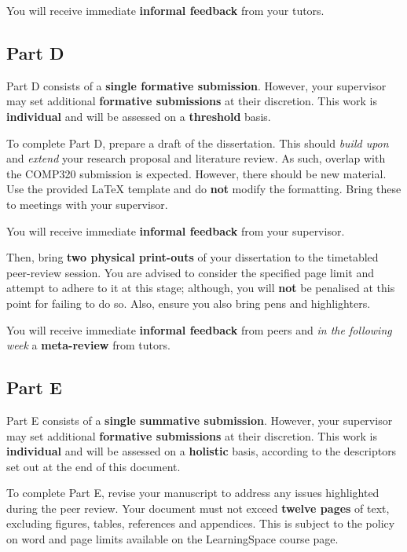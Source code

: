\documentclass{../fal_assignment}
\begin{document}
You will receive immediate \textbf{informal feedback} from your tutors.

\subsection*{Part D}

Part D consists of a \textbf{single formative submission}. 
However, your supervisor may set additional \textbf{formative submissions} at their discretion.
This work is \textbf{individual} and will be assessed on a \textbf{threshold} basis.

To complete Part D, prepare a draft of the dissertation. This should \textit{build upon} and \textit{extend} your research proposal and
literature review. As such, overlap with the COMP320 submission is expected. However, there should be new material.
Use the provided LaTeX template and do \textbf{not} modify the formatting. Bring these to meetings with your supervisor.

You will receive immediate \textbf{informal feedback} from your supervisor.

Then, bring \textbf{two physical print-outs} of your dissertation to the timetabled peer-review session. 
You are advised to consider the specified page limit and attempt to adhere to it at this stage; although, you will \textbf{not} be penalised at this point for failing to do so.  Also, ensure you also bring pens and highlighters.

You will receive immediate \textbf{informal feedback} from peers and \textit{in the following week} a \textbf{meta-review} from tutors.

\subsection*{Part E}

Part E consists of a \textbf{single summative submission}. However, your supervisor may set additional \textbf{formative submissions} at their discretion.
This work is \textbf{individual} and will be assessed on a \textbf{holistic} basis, according to the descriptors set out at the end of this document.

To complete Part E, revise your manuscript to address any issues highlighted during the peer review.
Your document must not exceed \textbf{twelve pages} of text, excluding figures, tables, references and appendices.
This is subject to the policy on word and page limits available on the LearningSpace course page.
\end{document}
